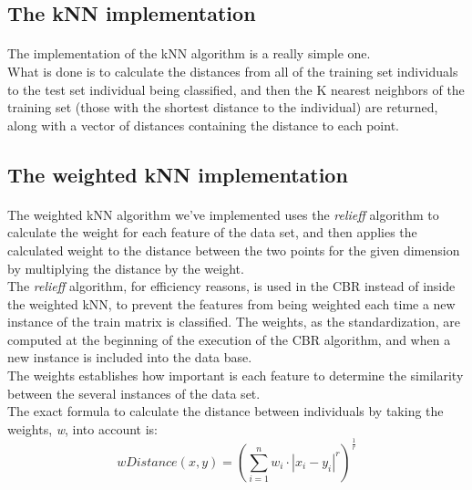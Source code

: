 \documentclass[12pt, a4paper]{article}
\begin{document}
\subsection{The kNN implementation} %
\label{sub:the_knn_implementation}
\paragraph{}The implementation of the kNN algorithm is a really simple one.\\

What is done is to calculate the distances from all of the training set individuals to the test set individual being classified, and then the K nearest neighbors of the training set (those with the shortest distance to the individual) are returned, along with a vector of distances containing the distance to each point.

\subsection{The weighted kNN implementation} %
\label{sub:the_weighted_knn_implementation}
\paragraph{}The weighted kNN algorithm we've implemented uses the \emph{relieff} algorithm to calculate the weight for each feature of the data set, and then applies the calculated weight to the distance between the two points for the given dimension by multiplying the distance by the weight.\\

The \emph{relieff} algorithm, for efficiency reasons, is used in the CBR instead of inside the weighted kNN, to prevent the features from being weighted each time a new instance of the train matrix is classified. The weights, as the standardization, are computed at the beginning of the execution of the CBR algorithm, and when a new instance is included into the data base.\\

The weights establishes how important is each feature to determine the similarity between the several instances of the data set.\\

The exact formula to calculate the distance between individuals by taking the weights, \emph{w}, into account is:
\[
	wDistance(x, y) = (\sum_{i=1}^{n}{w_i\cdot|x_i-y_i|^r})^\frac{1}{r}
\]
\end{document}
